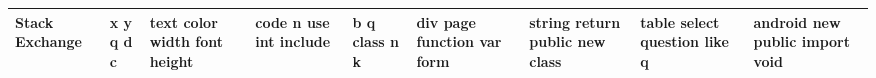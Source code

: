 \documentclass[11pt,a4paper]{article}
\begin{document}
\begin{appendices}
\begin{table}[htb]
\begin{tiny}
\begin{tabular}{|p{}|p{}|p{}|p{}|p{}|p{}|p{}|p{}|p{}|}
    Stack Exchange & x \newline y \newline q \newline d \newline c & text \newline color \newline width \newline font \newline height & code \newline n \newline use \newline int \newline include & b \newline q \newline class \newline n \newline k & div \newline page \newline function \newline var \newline form & string \newline return \newline public \newline new \newline class & table \newline select \newline question \newline like \newline q & android \newline new \newline public \newline import \newline void\\\hline

\end{tabular}
\end{tiny}
\end{table}
\end{appendices}
\end{document}
